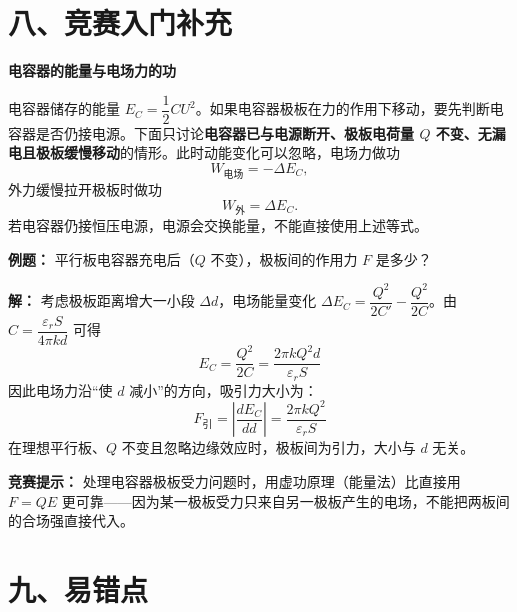 \section*{八、竞赛入门补充}

\begin{competitionbox}
\textbf{电容器的能量与电场力的功}

电容器储存的能量 $E_C = \dfrac12 CU^2$。如果电容器极板在力的作用下移动，要先判断电容器是否仍接电源。下面只讨论\textbf{电容器已与电源断开、极板电荷量 $Q$ 不变、无漏电且极板缓慢移动}的情形。此时动能变化可以忽略，电场力做功
\[
W_{\text{电场}}=-\Delta E_C,
\]
外力缓慢拉开极板时做功
\[
W_{\text{外}}=\Delta E_C.
\]
若电容器仍接恒压电源，电源会交换能量，不能直接使用上述等式。

\textbf{例题：} 平行板电容器充电后（$Q$ 不变），极板间的作用力 $F$ 是多少？

\textbf{解：} 考虑极板距离增大一小段 $\Delta d$，电场能量变化 $\Delta E_C = \dfrac{Q^2}{2C'}-\dfrac{Q^2}{2C}$。由 $C = \dfrac{\varepsilon_r S}{4\pi k d}$ 可得
\[
E_C = \frac{Q^2}{2C} = \frac{2\pi k Q^2 d}{\varepsilon_r S}
\]
因此电场力沿“使 $d$ 减小”的方向，吸引力大小为：
\[
F_{\text{引}} = \left|\frac{dE_C}{dd}\right| = \frac{2\pi k Q^2}{\varepsilon_r S}
\]
在理想平行板、$Q$ 不变且忽略边缘效应时，极板间为引力，大小与 $d$ 无关。

\textbf{竞赛提示：} 处理电容器极板受力问题时，用虚功原理（能量法）比直接用 $F = QE$ 更可靠——因为某一极板受力只来自另一极板产生的电场，不能把两板间的合场强直接代入。
\end{competitionbox}

\section*{九、易错点}

